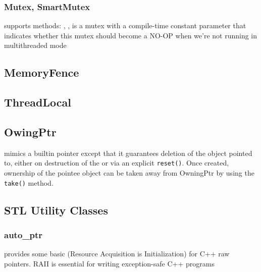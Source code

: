 \documentclass{myproc}
\begin{document}
\subsubsection{Mutex, SmartMutex}
\bit
\w supports methods: , , 
\w {} is a mutex with a compile-time constant parameter that
indicates whether this mutex should become a NO-OP when we're not running in
multithreaded mode
\eit

\subsection{MemoryFence}
\bit
\w 
\eit

\subsection{ThreadLocal}
\bit
\w 
\eit

\subsection{OwingPtr}
\bit
\w {} mimics a builtin pointer except that it guarantees deletion
of the object pointed to, either on destruction of the  or via an
explicit \verb+reset()+. Once created, ownership of the pointee object can be
taken away from OwningPtr by using the \verb+take()+ method.
\eit

\subsection{STL Utility Classes}
\subsubsection{auto\_ptr}
\bit
\w provides some basic  (Resource Acquisition is Initialization) for
C++ raw pointers. 
  \bit
  \w RAII is essential for writing exception-safe C++ programs
  \eit
\eit
\end{document}
